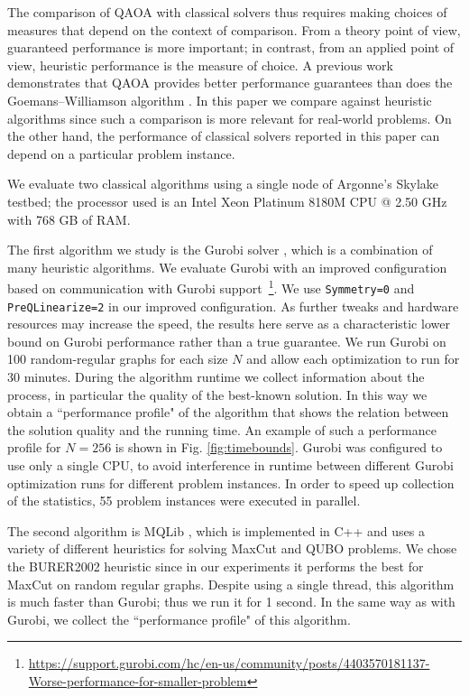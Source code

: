 \documentclass[prb,reprint,nofootinbib,longbibliography,superscriptaddress]{revtex4-1}
\begin{document}
The comparison of QAOA with classical solvers thus requires making choices of measures that depend on the context of comparison. From a theory point of view, guaranteed performance is more important; in contrast, from an applied point of view, heuristic performance is the measure of choice.
A previous work \cite{Wurtz_guarantee} demonstrates that
QAOA provides better performance guarantees than does the Goemans--Williamson algorithm \cite{gw-algo}.
In this paper we  compare against heuristic algorithms since such a comparison is more 
relevant for real-world problems.
On the other hand, the performance of classical solvers reported in this paper
can depend on a particular problem instance.

We evaluate two classical algorithms using a single node of Argonne's Skylake testbed; the processor used is an Intel Xeon Platinum 8180M CPU @ 2.50 GHz with 768 GB of RAM.

The first algorithm we study is the Gurobi solver \cite{gurobi}, which is a combination of many heuristic algorithms.
We evaluate Gurobi with an improved configuration based on communication with 
Gurobi support~\footnote{\url{https://support.gurobi.com/hc/en-us/community/posts/4403570181137-Worse-performance-for-smaller-problem}}.
We use \texttt{Symmetry=0} and \texttt{PreQLinearize=2} in our improved configuration.
As further tweaks and hardware resources may increase the speed, the results here serve as a characteristic lower bound on Gurobi performance rather than a true guarantee. 
We run Gurobi on 100 random-regular graphs for each size $N$ and allow each optimization to run for 30 minutes.
During the algorithm runtime we collect information about the process, in particular the quality of the best-known solution.
In this way we obtain a ``performance profile" 
of the algorithm that shows the relation between the solution quality and the running time. An example of such a performance profile for $N=256$ is shown in Fig. \ref{fig:timebounds}.
Gurobi was configured to use only a single CPU, to avoid interference in runtime between different Gurobi optimization runs for different problem instances. In order to speed up collection of the statistics, 
55 problem instances were executed in parallel.

The second algorithm is MQLib \cite{MQLib},
which is implemented in C++ and uses a variety of different heuristics
for solving MaxCut and QUBO problems.
We chose the BURER2002 heuristic since in our experiments it 
performs the best for MaxCut on random regular graphs.
Despite using a single thread, this algorithm is much faster than Gurobi; thus we run it for 1 second.
In the same way as with Gurobi, we collect the
``performance profile" of this algorithm.
\end{document}
